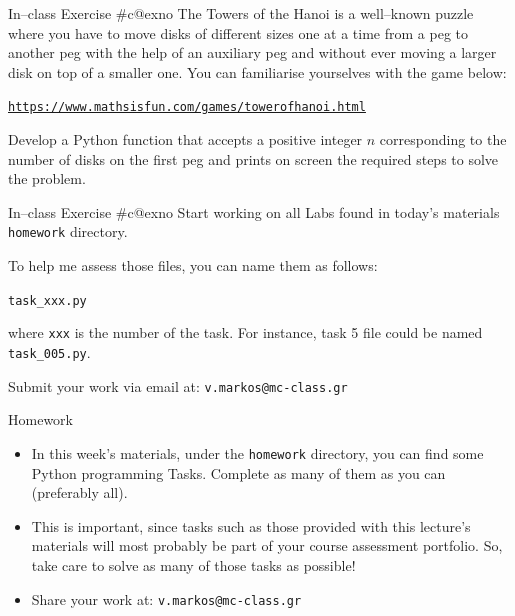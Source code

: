 \documentclass[aspectratio=169, 12pt, xcolor=table]{beamer}
\makeatletter
\newcommand{\ohref}[1]{\href{#1}{\texttt{#1}}}
\newcommand{\arabicthree}[1]{\expandafter\@arabicthree\csname c@#1\endcsname}
\newcommand{\@arabicthree}[1]{\ifnum #1<100 0\fi\ifnum #1<10 0\fi\number#1}
\newcounter{exno}
\newcommand{\exno}{\stepcounter{exno}In--class Exercise \#\arabicthree{exno}}
\makeatother
\begin{document}
	\begin{frame}{\exno}
		The Towers of the Hanoi is a well--known puzzle where you have to move disks of different sizes one at a time from a peg to another peg with the help of an auxiliary peg and without ever moving a larger disk on top of a smaller one. You can familiarise yourselves with the game below:
		\begin{center}
			\ohref{https://www.mathsisfun.com/games/towerofhanoi.html}
		\end{center}
		Develop a Python function that accepts a positive integer $n$ corresponding to the number of disks on the first peg and prints on screen the required steps to solve the problem.
	\end{frame}
	
	\begin{frame}{\exno}
		Start working on all Labs found in today's materials \texttt{homework} directory.
		
		To help me assess those files, you can name them as follows:
		\begin{center}
			\texttt{task\_xxx.py}
		\end{center}
		where \texttt{xxx} is the number of the task. For instance, task 5 file could be named \texttt{task\_005.py}.
		
		Submit your work via email at: \texttt{v.markos@mc-class.gr}
	\end{frame}

	\begin{frame}{Homework}
		\begin{itemize}
			\item In this week's materials, under the \texttt{homework} directory, you can find some Python programming Tasks. Complete as many of them as you can (preferably all).
			\item This is important, since tasks such as those provided with this lecture's materials will most probably be part of your course assessment portfolio. So, take care to solve as many of those tasks as possible!
			\item Share your work at: \texttt{v.markos@mc-class.gr}
		\end{itemize}
	\end{frame}
\end{document}
